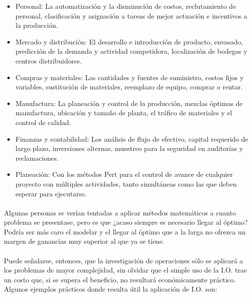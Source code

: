 \documentclass[12pt, a4paper,spanish]{article}
\begin{document}
		\begin{itemize}

			\item Personal: La automatización y la disminución de costos, reclutamiento de personal, clasificación y asignación a tareas de mejor actuación e incentivos a la producción.\cite{wikipedia_IO}

			\item Mercado y distribución: El desarrollo e introducción de producto, envasado, predicción de la demanda y actividad competidora, localización de bodegas y centros distribuidores.\cite{wikipedia_IO}

			\item Compras y materiales: Las cantidades y fuentes de suministro, costos fijos y variables, sustitución de materiales, reemplazo de equipo, comprar o rentar.\cite{wikipedia_IO}

			\item Manufactura: La planeación y control de la producción, mezclas óptimas de manufactura, ubicación y tamaño de planta, el tráfico de materiales y el control de calidad.\cite{wikipedia_IO}

			\item Finanzas y contabilidad: Los análisis de flujo de efectivo, capital requerido de largo plazo, inversiones alternas, muestreo para la seguridad en auditorías y reclamaciones.\cite{wikipedia_IO}

			\item Planeación: Con los métodos Pert para el control de avance de cualquier proyecto con múltiples actividades, tanto simultáneas como las que deben esperar para ejecutarse.\cite{wikipedia_IO}

		\end{itemize}

		\paragraph{}
		Algunas personas se verían tentadas a aplicar métodos matemáticos a cuanto problema se presentase, pero es que ¿acaso siempre es necesario llegar al óptimo? Podría ser más caro el modelar y el llegar al óptimo que a la larga no ofrezca un margen de ganancias muy superior al que ya se tiene.\cite{wikipedia_IO}

		\paragraph{}
		Puede señalarse, entonces, que la investigación de operaciones sólo se aplicará a los problemas de mayor complejidad, sin olvidar que el simple uso de la I.O. trae un costo que, si se supera el beneficio, no resultará económicamente práctico. Algunos ejemplos prácticos donde resulta útil la aplicación de I.O. son:\cite{wikipedia_IO}
\end{document}
